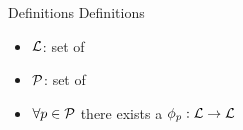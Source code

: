 \begin{frame}{Definitions}
	Definitions
	\begin{itemize}
		\item $\mathcal{L}$: set of 
		\item $\mathcal{P}$: set of 
		\item $\forall p \in \mathcal{P}$ there exists a $\phi_{p}: \mathcal{L} \rightarrow \mathcal{L}$
	\end{itemize}
\end{frame}
